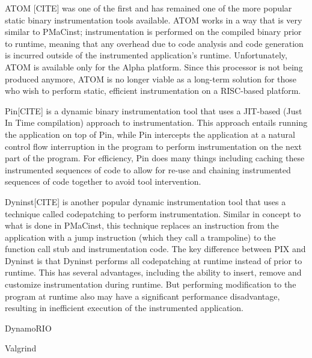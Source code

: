 ATOM [CITE] was one of the first and has remained one of
the more popular static binary instrumentation tools
available. ATOM works in a way that is very similar to
PMaCinst; instrumentation is performed on the compiled
binary prior to runtime, meaning that any overhead due to
code analysis and code generation is incurred outside of
the instrumented application’s runtime. Unfortunately,
ATOM is available only for the Alpha platform. Since this
processor is not being produced anymore, ATOM is no
longer viable as a long-term solution for those who wish to
perform static, efficient instrumentation on a RISC-based
platform. 

Pin[CITE] is a dynamic binary instrumentation tool that
uses a JIT-based (Just In Time compilation) approach to
instrumentation. This approach entails running the
application on top of Pin, while Pin intercepts the
application at a natural control flow interruption in the
program to perform instrumentation on the next part of the
program. For efficiency, Pin does many things including
caching these instrumented sequences of code to allow for
re-use and chaining instrumented sequences of code
together to avoid tool intervention.

Dyninst[CITE] is another popular dynamic
instrumentation tool that uses a technique called codepatching
to perform instrumentation. Similar in concept to
what is done in PMaCinst, this technique replaces an
instruction from the application with a jump instruction
(which they call a trampoline) to the function call stub and
instrumentation code. The key difference between
PIX and Dyninst is that Dyninst performs all codepatching
at runtime instead of prior to runtime. This has
several advantages, including the ability to insert, remove
and customize instrumentation during runtime. But
performing modification to the program at runtime also
may have a significant performance disadvantage, resulting in
inefficient execution of the instrumented application.

DynamoRIO

Valgrind
